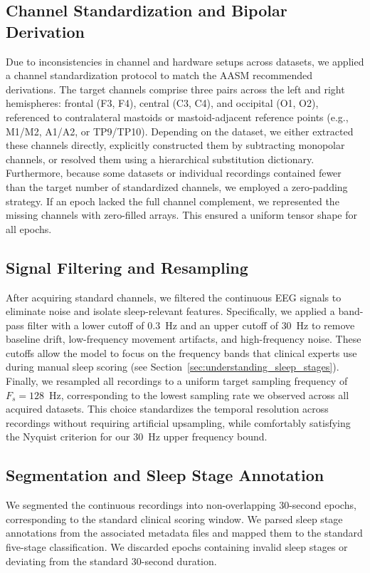 \subsection{Channel Standardization and Bipolar Derivation}
Due to inconsistencies in channel and hardware setups across datasets, we applied a channel standardization protocol to match the AASM recommended derivations. The target channels comprise three pairs across the left and right hemispheres: frontal (F3, F4), central (C3, C4), and occipital (O1, O2), referenced to contralateral mastoids or mastoid-adjacent reference points (e.g., M1/M2, A1/A2, or TP9/TP10). 
Depending on the dataset, we either extracted these channels directly, explicitly constructed them by subtracting monopolar channels, or resolved them using a hierarchical substitution dictionary.
Furthermore, because some datasets or individual recordings contained fewer than the target number of standardized channels, we employed a zero-padding strategy. If an epoch lacked the full channel complement, we represented the missing channels with zero-filled arrays. This ensured a uniform tensor shape for all epochs.

\subsection{Signal Filtering and Resampling}
After acquiring standard channels, we filtered the continuous EEG signals to eliminate noise and isolate sleep-relevant features. Specifically, we applied a band-pass filter with a lower cutoff of $0.3$~Hz and an upper cutoff of $30$~Hz to remove baseline drift, low-frequency movement artifacts, and high-frequency noise. These cutoffs allow the model to focus on the frequency bands that clinical experts use during manual sleep scoring (see Section~\ref{sec:understanding_sleep_stages}).
Finally, we resampled all recordings to a uniform target sampling frequency of $F_s = 128$~Hz, corresponding to the lowest sampling rate we observed across all acquired datasets. This choice standardizes the temporal resolution across recordings without requiring artificial upsampling, while comfortably satisfying the Nyquist criterion for our $30$~Hz upper frequency bound.

\subsection{Segmentation and Sleep Stage Annotation}
We segmented the continuous recordings into non-overlapping $30$-second epochs, corresponding to the standard clinical scoring window. We parsed sleep stage annotations from the associated metadata files and mapped them to the standard five-stage classification. We discarded epochs containing invalid sleep stages or deviating from the standard 30-second duration.

